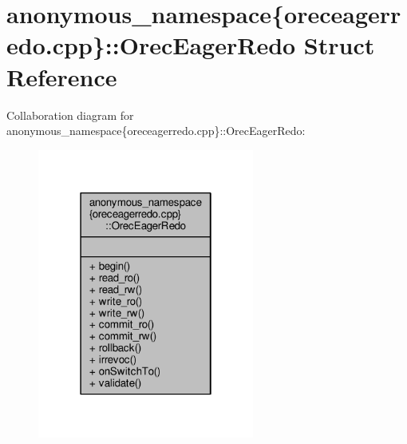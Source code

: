 \hypertarget{structanonymous__namespace_02oreceagerredo_8cpp_03_1_1OrecEagerRedo}{\section{anonymous\-\_\-namespace\{oreceagerredo.\-cpp\}\-:\-:Orec\-Eager\-Redo Struct Reference}
\label{structanonymous__namespace_02oreceagerredo_8cpp_03_1_1OrecEagerRedo}
}


Collaboration diagram for anonymous\-\_\-namespace\{oreceagerredo.\-cpp\}\-:\-:Orec\-Eager\-Redo\-:
\nopagebreak
\begin{figure}[H]
\begin{center}
\leavevmode
\includegraphics[width=202pt]{structanonymous__namespace_02oreceagerredo_8cpp_03_1_1OrecEagerRedo__coll__graph}
\end{center}
\end{figure}
